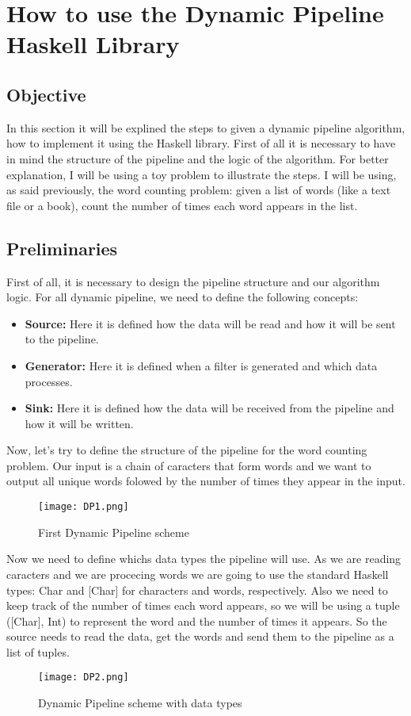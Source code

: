 \chapter{How to use the Dynamic Pipeline Haskell Library}
\section{Objective}
In this section it will be explined the steps to given a dynamic pipeline algorithm, how to implement it using the Haskell library. 
First of all it is necessary to have in mind the structure of the pipeline and the logic of the algorithm.
For better explanation, I will be using a toy problem to illustrate the steps.
I will be using, as said previously, the word counting problem: given a list of words (like a text file or a book), count the number of times each word appears in the list.

\section{Preliminaries}
First of all, it is necessary to design the pipeline structure and our algorithm logic. 
For all dynamic pipeline, we need to define the following concepts:
\begin{itemize} 
    \item \textbf{Source:} Here it is defined how the data will be read and how it will be sent to the pipeline.
    \item \textbf{Generator:} Here it is defined when a filter is generated and which data processes.
    \item \textbf{Sink:} Here it is defined how the data will be received from the pipeline and how it will be written.
\end{itemize}

Now, let's try to define the structure of the pipeline for the word counting problem.
Our input is a chain of caracters that form words and we want to output all unique words folowed by the number of times they appear in the input. \\
\begin{figure}[H]
    \centering
    \texttt{[image: DP1.png]}
    \caption{First Dynamic Pipeline scheme}
    \label{fig:DP1}
\end{figure}

Now we need to define whichs data types the pipeline will use. 
As we are reading caracters and we are procecing words we are going to use the standard Haskell types: Char and [Char] for characters and words, respectively.
Also we need to keep track of the number of times each word appears, so we will be using a tuple ([Char], Int) to represent the word and the number of times it appears.
So the source needs to read the data, get the words and send them to the pipeline as a list of tuples. 
\begin{figure}[H]
    \centering
    \texttt{[image: DP2.png]}
    \caption{Dynamic Pipeline scheme with data types}
    \label{fig:DP2}
\end{figure}

